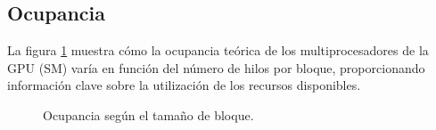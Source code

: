     \subsection{Ocupancia}

        La figura \ref{fig:histogram_ioccupancy_per_threadsPerBlock} muestra cómo la ocupancia teórica de los multiprocesadores de la GPU (SM) varía en función del número de hilos por bloque, proporcionando información clave sobre la utilización de los recursos disponibles.

        \begin{figure}[H]
            \centering
            \caption{Ocupancia según el tamaño de bloque.}
            \label{fig:histogram_ioccupancy_per_threadsPerBlock}
        \end{figure}

